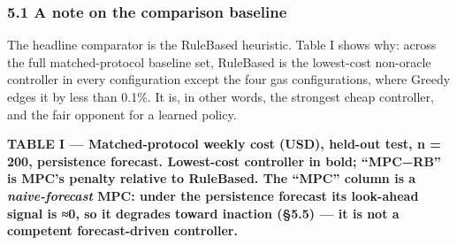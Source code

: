 \documentclass[
  11pt,
]{article}
\begin{document}
\subsubsection{5.1 A note on the comparison
baseline}\label{a-note-on-the-comparison-baseline}

The headline comparator is the RuleBased heuristic. Table I shows why:
across the full matched-protocol baseline set, RuleBased is the
lowest-cost non-oracle controller in every configuration except the four
gas configurations, where Greedy edges it by less than 0.1\%. It is, in
other words, the strongest cheap controller, and the fair opponent for a
learned policy.

\textbf{TABLE I --- Matched-protocol weekly cost (USD), held-out test, n
= 200, persistence forecast. Lowest-cost controller in bold; ``MPC−RB''
is MPC's penalty relative to RuleBased. The ``MPC'' column is a
\emph{naive-forecast} MPC: under the persistence forecast its look-ahead
signal is ≈0, so it degrades toward inaction (§5.5) --- it is not a
competent forecast-driven controller.}
\end{document}
